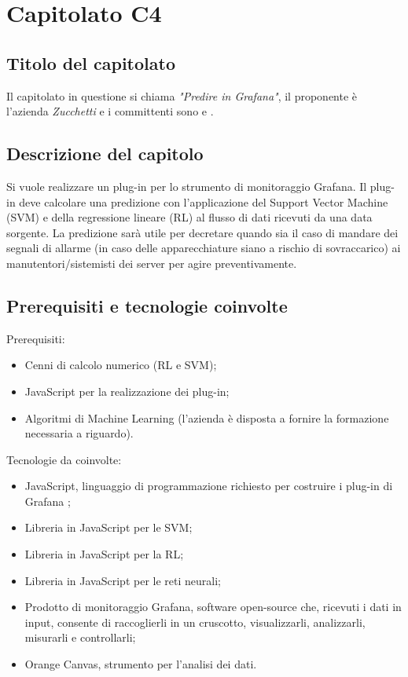 \section{Capitolato C4}
\subsection{Titolo del capitolato}
Il capitolato in questione si chiama \textit{"Predire in Grafana"}, il proponente è l'azienda \textit{Zucchetti} e i committenti sono \VT{} e \CR{}.

\subsection{Descrizione del capitolo}
Si vuole realizzare un plug-in per lo strumento di monitoraggio Grafana. Il plug-in deve calcolare una predizione con l'applicazione del Support Vector Machine (SVM) e della regressione lineare (RL) al flusso di dati ricevuti da una data sorgente. La predizione sarà utile per decretare quando sia il caso di mandare dei segnali di allarme (in caso delle apparecchiature siano a rischio di sovraccarico) ai manutentori/sistemisti dei server per agire preventivamente.

\subsection{Prerequisiti e tecnologie coinvolte}
Prerequisiti:
\begin{itemize}
\item Cenni di calcolo numerico (RL e SVM);
\item JavaScript per la realizzazione dei plug-in;
\item Algoritmi di Machine Learning (l'azienda \`e disposta a fornire la formazione necessaria a riguardo).
\end{itemize}
Tecnologie da coinvolte:
\begin{itemize}
\item JavaScript, linguaggio di programmazione richiesto per costruire i plug-in di Grafana ;
\item Libreria in JavaScript per le SVM;
\item Libreria in JavaScript per la RL;
\item Libreria in JavaScript per le reti neurali;
\item Prodotto di monitoraggio Grafana, software open-source che, ricevuti i dati in input, consente di raccoglierli in un cruscotto, visualizzarli, analizzarli, misurarli e controllarli;
\item Orange Canvas, strumento per l'analisi dei dati.
\end{itemize}


